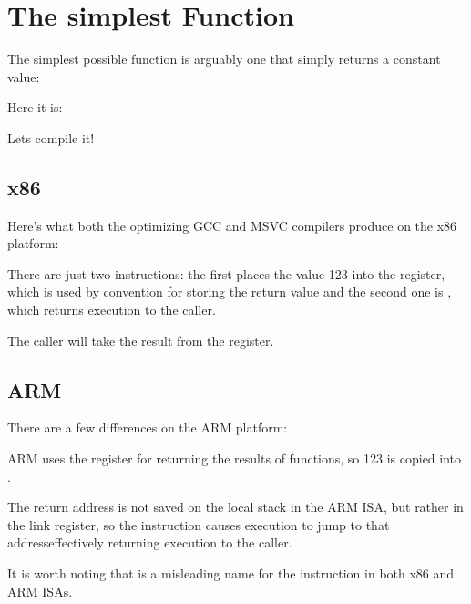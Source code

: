\chapter{The simplest Function}

The simplest possible function is arguably one that simply returns a constant value:

Here it is:



Lets compile it!

\section{x86}

Here's what both the optimizing GCC and MSVC compilers produce on the x86 platform:



There are just two instructions: the first places the value 123 into the \EAX register, 
which is used by convention for storing the return
value and the second one is \RET, which returns execution to the \gls{caller}.

The caller will take the result from the \EAX register.

\ifdefined\IncludeARM
\section{ARM}

There are a few differences on the ARM platform:



ARM uses the register  for returning the results of functions, so 123 is copied into .

The return address is not saved on the local stack in the ARM \ac{ISA}, but rather in the link register, 
so the  instruction causes execution to jump to that address\EMDASH{}effectively returning execution to the \gls{caller}.
\fi %

It is worth noting that \MOV is a misleading name for the instruction in both x86 and ARM \ac{ISA}s.

